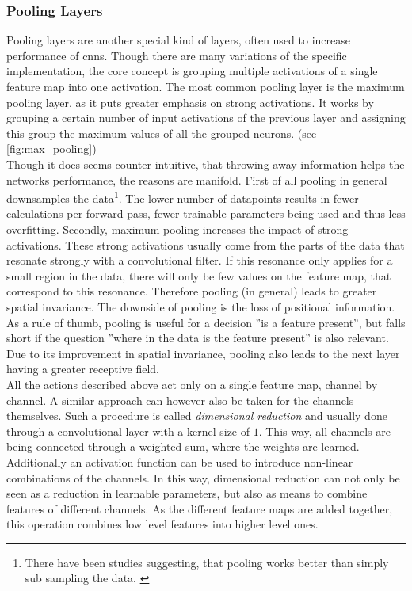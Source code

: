 \subsubsection{Pooling Layers}\label{sec:pooling_layers}
Pooling layers are another special kind of layers, often used to increase performance of \gls{cnns}. Though there are many variations of the specific implementation, the core concept is grouping multiple activations of a single feature map into one activation. The most common pooling layer is the maximum pooling layer, as it puts greater emphasis on strong activations. \cite{max_pooling_invention} It works by grouping a certain number of input activations of the previous layer and assigning this group the maximum values of all the grouped neurons. (see \autoref{fig:max_pooling})\\
Though it does seems counter intuitive, that throwing away information helps the networks performance, the reasons are manifold. First of all pooling in general downsamples the data\footnote{There have been studies suggesting, that pooling works better than simply sub sampling the data. \cite{pooling_vs_subsampling}}. The lower number of datapoints results in fewer calculations per forward pass, fewer trainable parameters being used and thus less overfitting. Secondly, maximum pooling increases the impact of strong activations. These strong activations usually come from the parts of the data that resonate strongly with a convolutional filter. If this resonance only applies for a small region in the data, there will only be few values on the feature map, that correspond to this resonance. Therefore pooling (in general) leads to greater spatial invariance. The downside of pooling is the loss of positional information. As a rule of thumb, pooling is useful for a decision ''is a feature present'', but falls short if the question ''where in the data is the feature present'' is also relevant. Due to its improvement in spatial invariance, pooling also leads to the next layer having a greater receptive field.\medskip\\
All the actions described above act only on a single feature map, channel by channel. A similar approach can however also be taken for the channels themselves. Such a procedure is called \emph{dimensional reduction} and usually done through a convolutional layer with a kernel size of $1$. This way, all channels are being connected through a weighted sum, where the weights are learned.\cite{dim_red_invention} Additionally an activation function can be used to introduce non-linear  combinations of the channels. In this way, dimensional reduction can not only be seen as a reduction in learnable parameters, but also as means to combine features of different channels. \cite{dim_red_interpretation} As the different feature maps are added together, this operation combines low level features into higher level ones.\\
